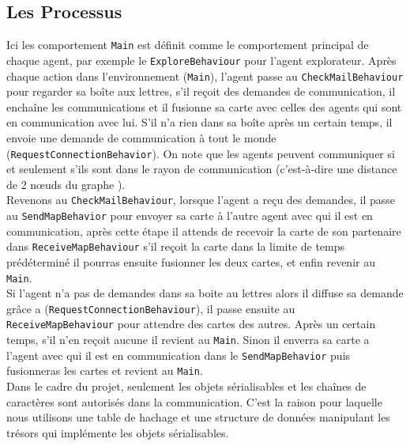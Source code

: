 \documentclass[10pt]{article}
\newcommand\tab[1][0.65cm]{\hspace*{#1}}
\begin{document}
\subsection{Les Processus}
Ici les comportement \texttt{Main} est définit comme le comportement principal de chaque agent, par exemple le \texttt{ExploreBehaviour} pour l'agent explorateur. Après chaque action dans l'environnement (\texttt{Main}), l'agent passe au \texttt{CheckMailBehaviour} pour regarder sa boîte aux lettres, s'il reçoit des demandes de communication, il enchaîne les communications et il fusionne sa carte avec celles des agents qui sont en communication avec lui. S'il n'a rien dans sa boîte après un certain temps, il envoie une demande de communication à tout le monde (\texttt{RequestConnectionBehavior}). On note que les agents peuvent communiquer si et seulement s'ils sont dans le rayon de communication (c'est-à-dire une distance de 2 nœuds du graphe ).\\
\tab Revenons au \texttt{CheckMailBehaviour}, lorsque l'agent a reçu des demandes, il passe au \texttt{SendMapBehavior} pour envoyer sa carte à l'autre agent avec qui il est en communication, après cette étape il attends de recevoir la carte de son partenaire dans \texttt{ReceiveMapBehaviour} s'il reçoit la carte dans la limite de temps prédéterminé il pourras ensuite fusionner les deux cartes, et enfin revenir au \texttt{Main}.\\
\tab Si l'agent n'a pas de demandes dans sa boite au lettres alors il diffuse sa demande grâce a (\texttt{RequestConnectionBehaviour}), il passe ensuite au \texttt{ReceiveMapBehaviour} pour attendre des cartes des autres. Après un certain temps, s'il n'en reçoit aucune il revient au \texttt{Main}. Sinon il enverra sa carte a l'agent avec qui il est en communication dans le \texttt{SendMapBehavior} puis fusionneras les cartes et revient au \texttt{Main}.\\
\tab Dans le cadre du projet, seulement les objets sérialisables et les chaînes de caractères sont autorisés dans la communication. C'est la raison pour laquelle nous utilisons une table de hachage et une structure de données manipulant les trésors qui implémente les objets sérialisables.
\end{document}
